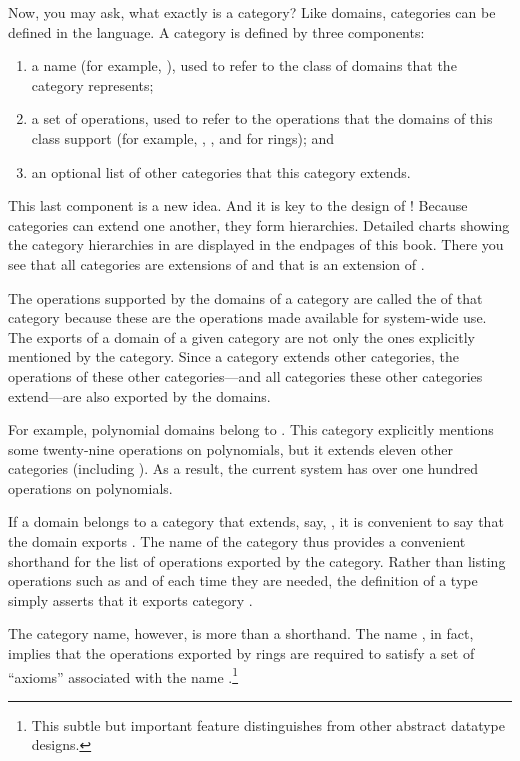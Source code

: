 Now, you may ask, what exactly is a category?
Like domains, categories can be defined in the \Language{} language.
A category is defined by three components:
%
\begin{enumerate}
\item a name (for example, ),
used to refer to the class of domains that the category represents;
\item a set of operations, used to refer to the operations that
the domains of this class support
(for example, \spadop{+}, \spadop{-}, and \spadop{*} for rings); and
\item an optional list of other categories that this category extends.
\end{enumerate}
%
This last component is a new idea.
And it is key to the design of \Language{}!
Because categories can extend one another, they form hierarchies.
Detailed charts showing the category hierarchies in \Language{} are
displayed in the endpages of this book.
There you see that all categories are extensions of  and that
 is an extension of .

The operations supported by the domains of a category are called the
 of that category because these are the
operations made available for system-wide use.
The exports of a domain of a given category are not only the ones
explicitly mentioned by the category.
Since a category extends other categories, the operations of these other
categories---and all categories these other categories extend---are also
exported by the domains.

For example, polynomial domains belong to .
This category explicitly mentions some twenty-nine
operations on polynomials, but it
extends eleven other categories (including ).
As a result, the current system has over one hundred operations on polynomials.

If a domain belongs to a category that extends, say, , it
is convenient to say that the domain exports .
The name of the category thus provides a convenient shorthand for the list
of operations exported by the category.
Rather than listing operations such as  and
 of  each time they are needed, the
definition of a type simply asserts that it exports category
.

The category name, however, is more than a shorthand.
The name , in fact, implies that the operations exported by
rings are required to satisfy a set of ``axioms'' associated with the name
.\footnote{This subtle
but important feature distinguishes \Language{} from
other abstract datatype designs.}

